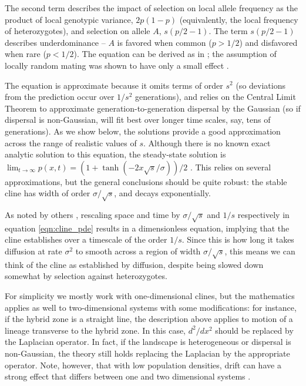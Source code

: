 \documentclass[11pt,letterpaper]{article}
\begin{document}
The second term %
describes the impact of selection on local allele frequency as the product of local genotypic variance, $2p(1-p)$
(equivalently, the local frequency of heterozygotes), 
and selection on allele $A$, $s (p/2-1)$. 
The term $s (p/2-1)$ describes underdominance -- $A$ is favored when common ($p>1/2$) and disfavored when rare ($p<1/2$).
The equation can be derived as in \citet{Nagylaki1975};
the assumption of locally random mating was shown to have only a small effect \citet{christiansen1995genotypic}.

The equation is approximate because it 
omits terms of order $s^2$
(so deviations from the prediction occur over $1/s^2$ generations),
and relies on the Central Limit Theorem to approximate generation-to-generation dispersal by the Gaussian
(so if dispersal is non-Gaussian, will fit best over longer time scales, say, tens of generations).   
As we show below, the solutions provide a good approximation across the range of realistic values of $s$.
Although there is no known exact analytic solution to this equation, 
the steady-state solution is
$\lim_{t \to \infty} p(x,t) = (1+\tanh(-2x\sqrt{s}/\sigma))/2$ \citep{Bazykin1969}. 
This relies on several approximations, but the general conclusions should be quite robust: 
the stable cline has width of order $\sigma/\sqrt{s}$, and decays exponentially. 

As noted by others \citep[e.g.,][]{Slatkin1973,may1975gene}, 
rescaling space and time by $\sigma/\sqrt{s}$ and $1/s$ respectively in equation \eqref{eqn:cline_pde} 
results in a dimensionless equation,
implying that the cline establishes over a timescale of the order $1/s$. 
Since this is how long it takes diffusion at rate $\sigma^2$ to smooth across a region of width $\sigma/\sqrt{s}$,
this means we can think of
the cline as established by diffusion, 
despite being slowed down somewhat by selection against heterozygotes. 

For simplicity we mostly work with one-dimensional clines,
but the mathematics applies as well to two-dimensional systems with some modifications:
for instance, if the hybrid zone is a straight line, 
the description above applies to motion of a lineage transverse to the hybrid zone.  
In this case, $d^2/dx^2$ should be replaced by the Laplacian operator.
In fact, if the landscape is heterogeneous or dispersal is non-Gaussian,
the theory still holds replacing the Laplacian by the appropriate operator.
Note, however, that with low population densities, 
drift can have a strong effect that differs between one and two dimensional systems \citep{cox1995hybrid,barton2010phylogeography,durrett2007width}.
\end{document}
